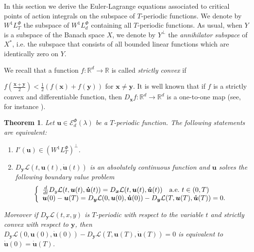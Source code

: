 \documentclass[twoside]{article}
\newtheorem{thm}{Theorem}[section]
\theoremstyle{remark}
\newcommand{\lphi}{L^{\Phi}}
\newcommand{\wphi}{W^{1}\lphi}
\newcommand{\domi}{\mathcal{E}^{\Phi}_d(\lambda)}
\renewcommand{\b}[1]{\boldsymbol{#1}}
\begin{document}
In this section we derive the Euler-Lagrange equations associated to critical points of action integrals on the subspace of $T$-periodic functions.  We denote by $\wphi_T$ the subspace of $\wphi_d$ containing all  $T$-periodic functions. As usual, when $Y$ is a subspace of
the Banach space $X$, we denote by $Y^{\perp}$ the \emph{annihilator subspace} of $X^*$, i.e. the subspace
that consists of all  bounded linear functions which are identically zero on $Y$.

We recall that  a function $f: \mathbb{R}^d \to \mathbb{R}$ is called \emph{strictly convex} if 

$f\left(\tfrac{\b{x}+\b{y}}{2}\right)< \tfrac{1}{2} \left(f\left(
\b{x}\right)+f\left( \b{y}\right)\right)$ for  $\b{x}\neq\b{y}$.  It is  well known that if $f$ is a strictly convex and differentiable function, then
$D_{\b{x}}f:\mathbb{R}^d\to\mathbb{R}^d$ is a one-to-one map  (see, for instance \cite[Thm. 12.17]{rockafellar2009variational}).


\begin{thm}\label{critpoint} Let $\b{u}\in\domi$ be  a $T$-periodic function. The following statements are equivalent:
\begin{enumerate}
 \item $I'(\b{u})\in\left( \wphi_T\right)^{\perp}$.
 \item  $D_{\b{y}}\mathcal{L}(t,\b{u}(t),\b{\dot{u}}(t))$ is an absolutely continuous function and $\b{u}$ solves the following boundary value problem
 \begin{equation}\label{ecualagran2}
    \left\{%
\begin{array}{ll}
   \frac{d}{dt} D_{y}\mathcal{L}(t,\b{u}(t),\b{\dot{u}}(t))= D_{\b{x}}\mathcal{L}(t,\b{u}(t),\b{\dot{u}}(t)) \quad \hbox{a.e.}\ t \in (0,T)\\
    \b{u}(0)-\b{u}(T)=D_{\b{y}}\mathcal{L}(0,\b{u}(0),\b{\dot{u}}(0))-D_{\b{y}}\mathcal{L}(T,\b{u}(T),\b{\dot{u}}(T))=0.
\end{array}%
\right.
\end{equation}
\end{enumerate}
Moreover if $D_{\b{y}}\mathcal{L}(t,x,y)$ is $T$-periodic with respect to the variable $t$ and strictly convex with respect to $\b{y}$, then
$D_{\b{y}}\mathcal{L}(0,\b{u}(0),\b{\b{\dot{\b{u}}}}(0))-D_{\b{y}}\mathcal{L}(T,\b{u}(T),\b{\dot{u}}(T))=0$ is equivalent to $\b{\dot{u}}(0)=\b{\dot{u}}(T)$.
\end{thm}
\end{document}
